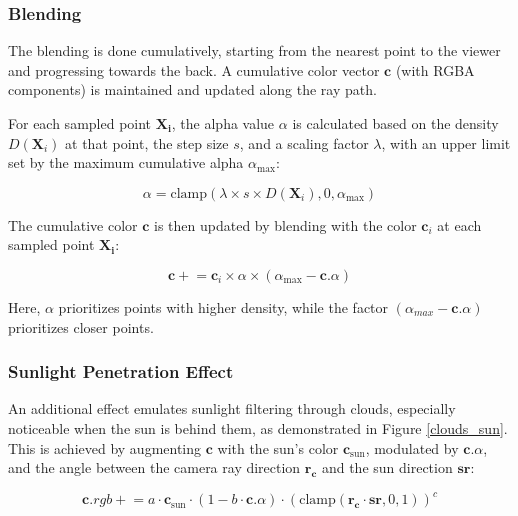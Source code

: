 \subsubsection{Blending}
\label{Cloud Blending}

The blending is done cumulatively, starting from the nearest point to the viewer and progressing towards the back. A cumulative color vector $\mathbf{c}$ (with RGBA components) is maintained and updated along the ray path.

For each sampled point $\mathbf{X_i}$, the alpha value $\alpha$ is calculated based on the density $D(\mathbf{X}_i)$ at that point, the step size $s$, and a scaling factor $\lambda$, with an upper limit set by the maximum cumulative alpha $\alpha_{\text{max}}$:

\begin{equation}
  \alpha = \text{clamp}(\lambda \times s \times D(\mathbf{X}_i), 0, \alpha_{\text{max}})
\end{equation}

The cumulative color $\mathbf{c}$ is then updated by blending with the color $\mathbf{c}_i$ at each sampled point $\mathbf{X_i}$:
  
\begin{equation}
  \mathbf{c} \mathrel{+}= \mathbf{c}_i \times \alpha \times (\alpha_{\text{max}} - \mathbf{c}.\alpha)
\end{equation}

Here, $\alpha$ prioritizes points with higher density, while the factor $(\alpha_{max} - \mathbf{c}.\alpha)$ prioritizes closer points. 


\subsubsection{Sunlight Penetration Effect}

An additional effect emulates sunlight filtering through clouds, especially noticeable when the sun is behind them, as demonstrated in Figure \ref{clouds_sun}. This is achieved by augmenting $\mathbf{c}$ with the sun's color $\mathbf{c}_{\text{sun}}$, modulated by $\mathbf{c}.\alpha$, and the angle between the camera ray direction $\mathbf{r_c}$ and the sun direction $\mathbf{sr}$:

\begin{equation}
  \mathbf{c}.rgb \mathrel{+}= a \cdot \mathbf{c}_{\text{sun}} \cdot (1 - b \cdot \mathbf{c}.\alpha) \cdot (\text{clamp}(\mathbf{r_c} \cdot \mathbf{sr}, 0, 1))^ c
\end{equation}

